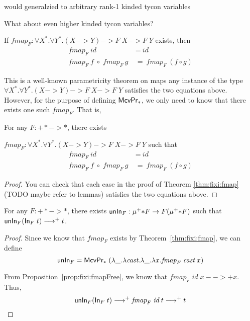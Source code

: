 would generalzied to arbitrary rank-1 kinded tycon variables


What about even higher kinded tycon variables?


\begin{proposition}\label{prop:fixi:fmapFree}
If $\textit{fmap}_F:\forall X^{*}.\forall Y^{*}.(X -> Y) -> F\;X -> F\;Y$
exists, then
\begin{align*}
\textit{fmap}_F~\textit{id} &~=~ \textit{id} \\
\textit{fmap}_F~\textit{f} \;\circ\; \textit{fmap}_F~\textit{g}
&~=~ \textit{fmap}_F~(f\circ g)
\end{align*}
\end{proposition}\noindent
This is a well-known parametricity theorem on maps any instance of the type
$\forall X^{*}.\forall Y^{*}.(X -> Y) -> F\;X -> F\;Y$ satisfies
the two equations above. However, for the purpose of defining $\mathsf{McvPr}_{*}$,
we only need to know that there exists one such $\textit{fmap}_F$. That is,
\begin{proposition}\label{prop:fixi:fmapHom}
For any $F : +* -> *$, there exists

$\textit{fmap}_F:\forall X^{*}.\forall Y^{*}.(X -> Y) -> F\;X -> F\;Y$
such that
\begin{align*}
\textit{fmap}_F~\textit{id} &~=~ \textit{id} \\
\textit{fmap}_F~\textit{f} \;\circ\; \textit{fmap}_F~\textit{g}
&~=~ \textit{fmap}_F~(f\circ g)
\end{align*}
\end{proposition}
\begin{proof}
	You can check that each case
	in the proof of Theorem \ref{thm:fixi:fmap} (TODO maybe refer to lemmas)
	satisfies the two equations above.
\end{proof}

\begin{proposition} For any $F : +* -> *$, there exists
$\mathsf{unIn}_F : \mu^{+}{*} F -> F(\mu^{+}{*} F)$ such that
$\mathsf{unIn}_F (\mathsf{In}_F\;t) -->+ t$.
\end{proposition}
\begin{proof}
Since we know that $\textit{fmap}_F$ exists by Theorem~\ref{thm:fixi:fmap},
we can define
\[ \mathsf{unIn}_F = \mathsf{McvPr}_{*}\;
            (\lambda\_.\lambda\textit{cast}.\lambda\_.\lambda x.\textit{fmap}_F\;\textit{cast}\;x)
\]

From Proposition~\ref{prop:fixi:fmapFree}, we know that
$\textit{fmap}_F\;\textit{id}\;x -->+ x$.
Thus,
\[ \mathsf{unIn}_F (\mathsf{In}_F\;t) -->+ \textit{fmap}_F\;\textit{id}\;t -->+ t \]
\end{proof}

